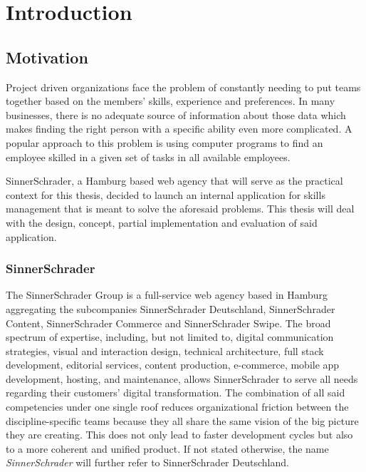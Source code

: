 \chapter{Introduction}

\section{Motivation}
Project driven organizations face the problem of constantly needing to put teams together based on the members’ skills, experience and preferences.
In many businesses, there is no adequate source of information about those data which makes finding the right person with a specific ability even more complicated. A popular approach to this problem is using computer programs to find an employee skilled in a given set of tasks in all available employees.

SinnerSchrader, a Hamburg based web agency that will serve as the practical context for this thesis, decided to launch an internal application for skills management that is meant to solve the aforesaid problems. This thesis will deal with the design, concept, partial implementation and evaluation of said application.



\subsection{SinnerSchrader}

The SinnerSchrader Group is a full-service web agency based in Hamburg aggregating the subcompanies SinnerSchrader Deutschland, SinnerSchrader Content, SinnerSchrader Commerce and SinnerSchrader Swipe. The broad spectrum of expertise, including, but not limited to, digital communication strategies, visual and interaction design,  technical architecture, full stack development, editorial services, content production, e-commerce, mobile app development, hosting, and maintenance, allows SinnerSchrader to serve all needs regarding their customers' digital transformation. The combination of all said competencies under one single roof reduces organizational friction between the discipline-specific teams because they all share the same vision of the big picture they are creating. This does not only lead to faster development cycles but also to a more coherent and unified product.
If not stated otherwise, the name \textit{SinnerSchrader} will further refer to SinnerSchrader Deutschland.

\newpage

